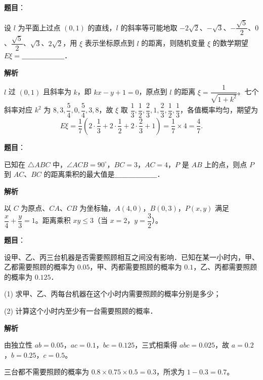 \begin{answer}

\textbf{题目}：

设 $l$ 为平面上过点 $(0, 1)$ 的直线，$l$ 的斜率等可能地取 $-2\sqrt{2}$、$-\sqrt{3}$、$-\dfrac{\sqrt{5}}{2}$、$0$、$\dfrac{\sqrt{5}}{2}$、$\sqrt{3}$、$2\sqrt{2}$，用 $\xi$ 表示坐标原点到 $l$ 的距离，则随机变量 $\xi$ 的数学期望 $E\xi =$＿＿＿＿＿＿．

\textbf{解析}

$l$ 过 $(0, 1)$ 且斜率为 $k$，即 $kx - y + 1 = 0$，原点到 $l$ 的距离 $\xi = \dfrac{1}{\sqrt{1 + k^2}}$。七个斜率对应 $k^2$ 为 $8, 3, \dfrac{5}{4}, 0, \dfrac{5}{4}, 3, 8$，故 $\xi$ 取 $\dfrac{1}{3}, \dfrac{1}{2}, \dfrac{2}{3}, 1, \dfrac{2}{3}, \dfrac{1}{2}, \dfrac{1}{3}$，各值概率均匀，期望为
\nopagebreak[4]
\[
E\xi = \frac{1}{7}\left(2\cdot\frac{1}{3} + 2\cdot\frac{1}{2} + 2\cdot\frac{2}{3} + 1\right) = \frac{1}{7}\times 4 = \frac{4}{7}.
\]


\end{answer}
\begin{answer}

\textbf{题目}：

已知在 $\triangle ABC$ 中，$\angle ACB = 90^\circ$，$BC = 3$，$AC = 4$，$P$ 是 $AB$ 上的点，则点 $P$ 到 $AC$、$BC$ 的距离乘积的最大值是＿＿＿＿＿＿．

\textbf{解析}

以 $C$ 为原点、$CA$、$CB$ 为坐标轴，$A(4, 0)$，$B(0, 3)$，$P(x, y)$ 满足 $\dfrac{x}{4} + \dfrac{y}{3} = 1$。距离乘积 $xy \leqslant 3$（当 $x = 2$，$y = \dfrac{3}{2}$）。


\end{answer}
\begin{answer}

\textbf{题目}：

设甲、乙、丙三台机器是否需要照顾相互之间没有影响．已知在某一小时内，甲、乙都需要照顾的概率为 $0.05$，甲、丙都需要照顾的概率为 $0.1$，乙、丙都需要照顾的概率为 $0.125$．

(1) 求甲、乙、丙每台机器在这个小时内需要照顾的概率分别是多少；

(2) 计算这个小时内至少有一台需要照顾的概率．

\textbf{解析}


由独立性 $ab = 0.05$，$ac = 0.1$，$bc = 0.125$，三式相乘得 $abc = 0.025$，故 $a = 0.2$，$b = 0.25$，$c = 0.5$。


三台都不需要照顾的概率为 $0.8 \times 0.75 \times 0.5 = 0.3$，所求为 $1 - 0.3 = 0.7$。



\end{answer}
